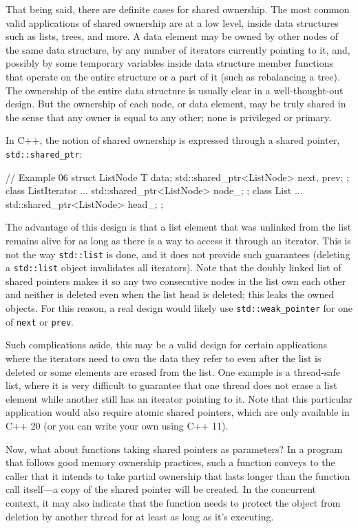 That being said, there are definite cases for shared ownership. The most common valid applications of shared ownership are at a low level, inside data structures such as lists, trees, and more. A data element may be owned by other nodes of the same data structure, by any number of iterators currently pointing to it, and, possibly by some temporary variables inside data structure member functions that operate on the entire structure or a part of it (such as rebalancing a tree). The ownership of the entire data structure is usually clear in a well-thought-out design. But the ownership of each node, or data element, may be truly shared in the sense that any owner is equal to any other; none is privileged or primary.

In C++, the notion of shared ownership is expressed through a shared pointer, \texttt{std::shared\_ptr}:

\begin{code}
// Example 06
struct ListNode {
  T data;
  std::shared_ptr<ListNode> next, prev;
};
class ListIterator {
  ...
  std::shared_ptr<ListNode> node_;
};
class List {
  ...
  std::shared_ptr<ListNode> head_;
};
\end{code}

The advantage of this design is that a list element that was unlinked from the list remains alive for as long as there is a way to access it through an iterator. This is not the way \texttt{std::list} is done, and it does not provide such guarantees (deleting a \texttt{std::list} object invalidates all iterators). Note that the doubly linked list of shared pointers makes it so any two consecutive nodes in the list own each other and neither is deleted even when the list head is deleted; this leaks the owned objects. For this reason, a real design would likely use \texttt{std::weak\_pointer} for one of \texttt{next} or \texttt{prev}.

Such complications aside, this may be a valid design for certain applications where the iterators need to own the data they refer to even after the list is deleted or some elements are erased from the list. One example is a thread-safe list, where it is very difficult to guarantee that one thread does not erase a list element while another still has an iterator pointing to it. Note that this particular application would also require atomic shared pointers, which are only available in C++ 20 (or you can write your own using C++ 11).

Now, what about functions taking shared pointers as parameters? In a program that follows good memory ownership practices, such a function conveys to the caller that it intends to take partial ownership that lasts longer than the function call itself---a copy of the shared pointer will be created. In the concurrent context, it may also indicate that the function needs to protect the object from deletion by another thread for at least as long as it's executing.


